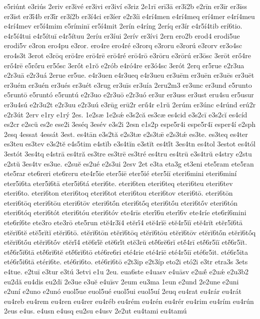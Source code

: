 {e5riúnt
e3riús
2eriv
er3ivé
er3ivi
er3iví
e3riz
2e1rī
erī3ā
er3ī2b
e2rīn
er3īr
er3īss
er3īst
er3ī́4b
er3ī́r
er3í2b
er3í4ci
er3íer
e2r3íi
e4rí4men
e4rí4meq
erí4mer
e4rí4meu
e4rí4mev
er5í4mim
e5ríminī
er5í4mit
2erín
e4ríng
2eríq
er3ír
e4r5í4tib
erí6tio.
e4r5í4tui
e4r5ítuī
e4r5ítuu
2eríu
er3íui
2erív
er3ívi
2ern
ero2b
erod4
erodi5ue
erodi5v
e3ron
ero4pu
e3ror.
ero4re
ero4ré
e3rorq
e3roru
e3rorú
e3rorv
er3o4sc
ero4s3t
3erot
e3rōq
erō4re
erō4rē
erō4ré
erō4rō
e3rōru
e3rōrú
er3ōsc
3erōt
erṓ4re
erṓ4rē
e5rṓru
er5ṓsc
3erṓt
e1rŏ
e2rób
e4ró4re
er3ó4sc
3erót
2erq
er5rue
e2r3ua
e2r3uā
e2r3uá
2erue
er5ue.
e4r3uen
e4r3ueq
e4r3ueu
er3uēm
er3uēn
er3uēs
er3uēt
er3uém
er3uén
er3ués
er3uét
e3rug
er3uīs
er3uía
2eru2m3
er3unc
er3und
e5runto
e5runtō
e5runtó
e5runtú
e2r3uo
e2r3uō
e2r3uó
er3ur
er3uss
er3ust
eru4su
er5usur
er3u4sú
e2r3u2t
e2r3uu
e2r3uú
e3rūg
erū2r
erū́4r
e1rŭ
2erúm
er3únc
e4rúnd
erú2r
e2r3út
2erv
e1ry
e1rý
2es.
1e2sæ
1e2sǽ
e3s2că
es3cæ
es4cid
e3s2cī
e3s2cĭ
es4cíd
es2cr
e2scŭ
es2e
ese2i
3eséq
3esév
e3s2i
2esn
e1s2p
espe5r4i
espe5r4ī
esper4í
e2sph
2esq
4essat
4essát
3est.
es4tān
e3s2tă
e2s3tæ
e2s3tǣ
e2s3tǽ
es3te.
es3teq
es4ter
es3teu
es3tev
e3s2tĕ
e4s5tim
e4stĭb
e3s4tĭn
e3stĭt
es4tĭ́t
3es4tn
es4tol
3estot
es4tól
3estót
3es4tq
e4strā
es4tră
es3tre
es3trē
es3tré
es4tru
es4trū
e3s4trŭ
e4stry
e2stu
e2stŭ
3es4tv
es3ue.
e2suĕ
es2ué
e2s3ui
2esv
2et
e3ta
eta3g
et3eni
ete5ram
ete5ran
ete5rar
ete6reri
ete6reru
ete4r5ie
eter5iē
eter5ié
eter5iī
eteri6mini
eteri6miní
eter5i6ta
eter5i6tā
eter5i6tá
eteri6te.
eteri6ten
eteri6teq
eteri6teu
eteri6tev
eteri6to.
eteri6ton
eteri6toq
eteri6tot
eteri6tou
eteri6tov
eteri6tō.
eteri6tōn
eteri6tōq
eteri6tōu
eteri6tōv
eteri6tṓn
eteri6tṓq
eteri6tṓu
eteri6tṓv
eteri6tón
eteri6tóq
eteri6tót
eteri6tóu
eteri6tóv
ete4rīs
eterī́6u
eterī́6v
ete4ríe
ete6rí6mini
ete6rí6te
ete3ro
ete3rō
ete5run
etĕ4r3ī4
etĕrī́4
etĕ4rĭē
etĕ4r5ĭī
etĕ4rĭt
etĕr5ĭ6tā
etĕrĭ6tĕ
etĕ5rĭtĭ
etĕrĭ6tō.
etĕrĭ6tōn
etĕrĭ6tōq
etĕrĭ6tōu
etĕrĭ6tōv
etĕrĭ6tṓn
etĕrĭ6tṓq
etĕrĭ6tṓu
etĕrĭ6tṓv
etĕrĭ́4
etĕ6rĭ́ĕ
etĕ6rĭ́t
etĕ3rŭ
etĕ́6rĕ6rĭ
etĕ́4rī
etĕ́6r5ĭī
etĕ́6r5ĭt.
etĕ́6r5ĭ6tā
etĕ́6rĭ6tĕ
etĕ́6rĭ6tō
eté6re6ri
eté4rie
eté4riē
eté4r5iī
eté6r5it.
eté6r5ita
eté6r5i6tā
etéri6te.
eté6ri6to.
eté6ri6tō
e2t3ip
e2t3íp
eto2i
etó2i
e3tr
etra3s
3ets
e4tue.
e2tuī
e3tur
e3tú
3etvi
e1u
2eu.
eua6ste
e4uasv
e4uāsv
e2uǣ́
e2uǽ
e2u3b2
eu2dă
eu4dis
eu2dī
2e3ue
e3uĕ
e4uīsv
2eum
eu3ma
1eun
e2und
2e2une
e2uni
e2uní
e2uno
e2unó
euol5ue
euol5ué
euol5ui
euol5uí
2euq
eu4rat
eu4rár
eu4rát
eu4reb
eu4rem
eu4ren
eu4rer
eu4réb
eu4rém
eu4rén
eu4rér
eu4rim
eu4rím
eu4rún
2eus
e4us.
e4usn
e4usq
eu2su
e4usv
2e2ut
eu4tami
eu4tamú
}
